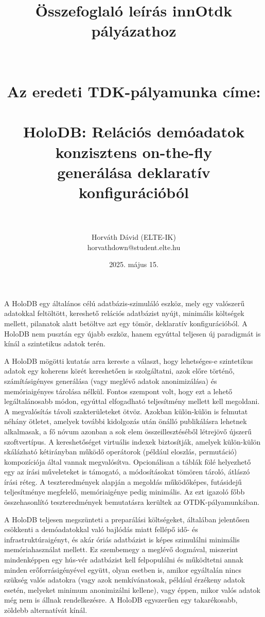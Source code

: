 \documentclass[12pt]{article}
\title{Összefoglaló leírás innOtdk pályázathoz \\ ~ \\ ~ \\ {\Large Az eredeti TDK-pályamunka címe: \\ ~ \\ HoloDB: Relációs demóadatok konzisztens on-the-fly \\ generálása deklaratív konfigurációból} \\ ~}
\author{Horváth Dávid (ELTE-IK) \\ horvathdown@student.elte.hu}
\date{2025. május 15.}
\begin{document}
\begin{titlepage}
\maketitle
\thispagestyle{empty}
\end{titlepage}

\cleardoublepage

A HoloDB egy általános célú adatbázis-szimuláló eszköz, mely egy valószerű adatokkal feltöltött, kereshető relációs adatbázist nyújt, minimális költségek mellett,
pilanatok alatt betöltve azt egy tömör, deklaratív konfigurációból.
A HoloDB nem pusztán egy újabb eszköz, hanem egyúttal teljesen új paradigmát is kínál a szintetikus adatok terén.

A HoloDB mögötti kutatás arra kereste a választ, hogy lehetséges-e szintetikus adatok egy koherens körét kereshetően is szolgáltatni, azok előre történő, számításigényes generálása (vagy meglévő adatok anonimizálása) és memóriaigényes tárolása nélkül.
Fontos szempont volt, hogy ezt a lehető legáltalánosabb módon, egyúttal elfogadható teljesítmény mellett kell megoldani.
A megvalósítás távoli szakterületeket ötvöz. Azokban külön-külön is felmutat néhány ötletet, amelyek további kidolgozás után önálló publikálásra lehetnek alkalmasak, a fő nóvum azonban a sok elem összeillesztéséből létrejövő újszerű szoftvertípus.
A kereshetőséget virtuális indexek biztosítják, amelyek külön-külön skálázható kétirányban működő operátorok (például eloszlás, permutáció) kompozíciója által vannak megvalósítva.
Opcionálisan a táblák fölé helyezhető egy az írási műveleteket is támogató, a módosításokat tömören tároló, átlászó írási réteg.
A teszteredmények alapján a megoldás működőképes, futásidejű teljesítménye megfelelő, memóriaigénye pedig minimális.
Az ezt igazoló főbb összehasonlító teszteredmények bemutatásra kerültek az OTDK-pályamunkában.

A HoloDB teljesen megszünteti a preparálási költségeket, általában jelentősen csökkenti a demóadatokkal való bajlódás miatt fellépő idő- és infrastruktúraigényt, és akár óriás adatbázist is képes szimulálni minimális memóriahasználat mellett.
Ez szembemegy a meglévő dogmával, miszerint mindenképpen egy hús-vér adatbázist kell felpopulálni és működtetni annak minden erőforrásigényével együtt, olyan esetben is, amikor egyáltalán nincs szükség valós adatokra (vagy azok nemkívánatosak, például érzékeny adatok esetén, melyeket minimum anonimizálni kellene),
vagy éppen, mikor valós adatok még nem is állnak rendelkezésre.
A HoloDB egyszerűen egy takarékosabb, zöldebb alternatívát kínál.
\end{document}
